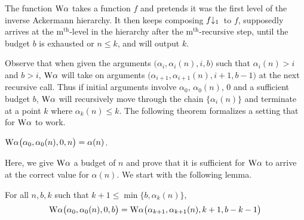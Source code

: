 {\color{magenta}The function $\text{W}\alpha$ takes a function $f$ and pretends it was the first level of the inverse Ackermann hierarchy. It then keeps composing $\cdt{f}{1}\ $ to $f$, supposedly arrives at the $\text{m}^{\text{th}}$-level in the hierarchy after the $\text{m}^{\text{th}}$-recursive step, until the budget $b$ is exhausted or $n\le k$, and will output $k$.}

{\color{blue} Observe that when given the arguments $\big(\alpha_i, \alpha_i(n), i, b\big)$ such that $\alpha_i(n) > i$ and $b > i$, $\text{W}\alpha$ will take on arguments $\big(\alpha_{i+1}, \alpha_{i+1}(n), i+1, b-1\big)$ at the next recursive call. Thus if initial arguments involve $\alpha_0$, $\alpha_0(n)$, $0$ and a sufficient budget $b$, $\text{W}\alpha$ will recursively move through the chain $\big\{\alpha_i(n)\big\}$ and terminate at a point $k$ where $\alpha_k(n)\le k$.}
The following theorem formalizes a setting that for $\text{W}\alpha$ to work.
\begin{thm} \label{thm: inv-ack-worker-correct}
	$\text{W}\alpha\big(\alpha_0, \alpha_0(n), 0, n\big) = \alpha(n)$.
\end{thm}
Here, we give $\text{W}\alpha$ a budget of $n$ and prove that it is sufficient for $\text{W}\alpha$ to arrive at the correct value for $\alpha(n)$. We start with the following lemma.
\begin{lem} \label{lem: inv-ack-worker-intermediate}
	For all $n, b, k$ such that $k+1\le \min\big\{b, \alpha_k(n)\big\}$, \begin{equation*}
	\text{W}\alpha\big(\alpha_0, \alpha_0(n), 0, b\big) = \text{W}\alpha\big(\alpha_{k+1}, \alpha_{k+1}(n), k+1, b-k-1\big)
	\end{equation*}
\end{lem}
